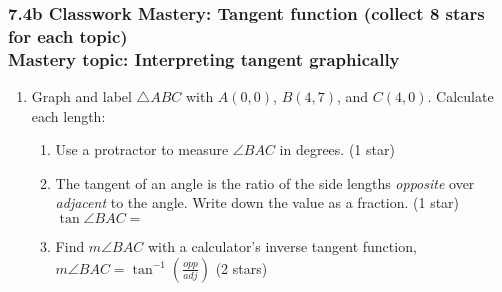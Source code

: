 \documentclass[12pt, twoside]{article}
\begin{document}
\subsubsection*{7.4b Classwork Mastery: Tangent function (collect 8 stars for each topic)\\[0.5cm]
Mastery topic: Interpreting tangent graphically}
\begin{enumerate}

\item Graph and label $\triangle ABC$ with $A(0,0)$, $B(4,7)$, and $C(4,0)$. Calculate each length:
  \begin{enumerate}[itemsep=1.25cm]  
  \vspace{2cm}
    \item Use a protractor to measure $\angle BAC$ in degrees.  \hfill (1 star)
    \item The tangent of an angle is the ratio of the side lengths \emph{opposite} over \emph{adjacent} to the angle. Write down the value as a fraction.  \hfill (1 star)\\[0.5cm]
      $\tan \angle BAC=$
    \item Find $m\angle BAC$ with a calculator's inverse tangent function,\\ $\displaystyle m \angle BAC = \tan^{-1}(\frac{opp}{adj})$  \hfill (2 stars)
  \end{enumerate}

\newpage

\end{enumerate}
\end{document}
